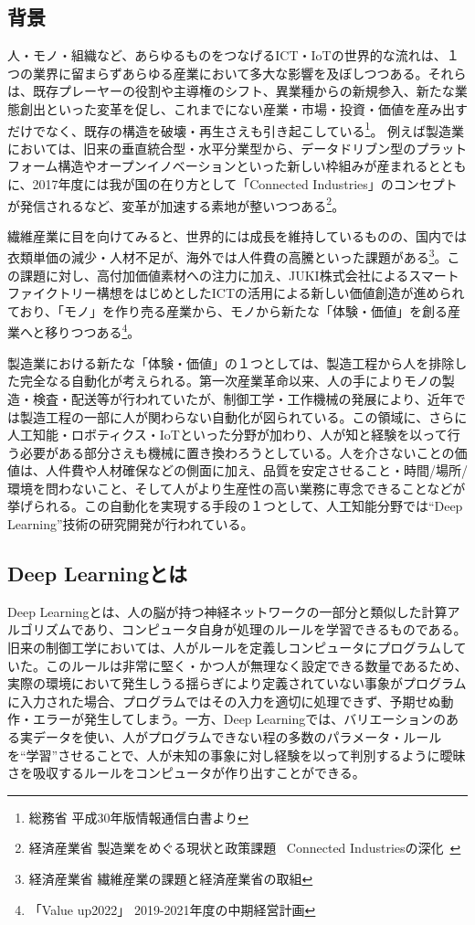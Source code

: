 \subsection{背景}
人・モノ・組織など、あらゆるものをつなげるICT・IoTの世界的な流れは、１つの業界に留まらずあらゆる産業において多大な影響を及ぼしつつある。それらは、既存プレーヤーの役割や主導権のシフト、異業種からの新規参入、新たな業態創出といった変革を促し、これまでにない産業・市場・投資・価値を産み出すだけでなく、既存の構造を破壊・再生さえも引き起こしている\footnote{総務省 平成30年版情報通信白書より}。
例えば製造業においては、旧来の垂直統合型・水平分業型から、データドリブン型のプラットフォーム構造やオープンイノベーションといった新しい枠組みが産まれるとともに、2017年度には我が国の在り方として「Connected Industries」のコンセプトが発信されるなど、変革が加速する素地が整いつつある\footnote{経済産業省 製造業をめぐる現状と政策課題 ~Connected Industriesの深化~}。

繊維産業に目を向けてみると、世界的には成長を維持しているものの、国内では衣類単価の減少・人材不足が、海外では人件費の高騰といった課題がある\footnote{経済産業省 繊維産業の課題と経済産業省の取組}。この課題に対し、高付加価値素材への注力に加え、JUKI株式会社によるスマートファイクトリー構想をはじめとしたICTの活用による新しい価値創造が進められており、「モノ」を作り売る産業から、モノから新たな「体験・価値」を創る産業へと移りつつある\footnote{「Value up2022」 2019-2021年度の中期経営計画}。

製造業における新たな「体験・価値」の１つとしては、製造工程から人を排除した完全なる自動化が考えられる。第一次産業革命以来、人の手によりモノの製造・検査・配送等が行われていたが、制御工学・工作機械の発展により、近年では製造工程の一部に人が関わらない自動化が図られている。この領域に、さらに人工知能・ロボティクス・IoTといった分野が加わり、人が知と経験を以って行う必要がある部分さえも機械に置き換わろうとしている。人を介さないことの価値は、人件費や人材確保などの側面に加え、品質を安定させること・時間/場所/環境を問わないこと、そして人がより生産性の高い業務に専念できることなどが挙げられる。この自動化を実現する手段の１つとして、人工知能分野では“Deep Learning”技術の研究開発が行われている。

\subsection{Deep Learningとは}
Deep Learningとは、人の脳が持つ神経ネットワークの一部分と類似した計算アルゴリズムであり、コンピュータ自身が処理のルールを学習できるものである。旧来の制御工学においては、人がルールを定義しコンピュータにプログラムしていた。このルールは非常に堅く・かつ人が無理なく設定できる数量であるため、実際の環境において発生しうる揺らぎにより定義されていない事象がプログラムに入力された場合、プログラムではその入力を適切に処理できず、予期せぬ動作・エラーが発生してしまう。一方、Deep Learningでは、バリエーションのある実データを使い、人がプログラムできない程の多数のパラメータ・ルールを“学習”させることで、人が未知の事象に対し経験を以って判別するように曖昧さを吸収するルールをコンピュータが作り出すことができる。

